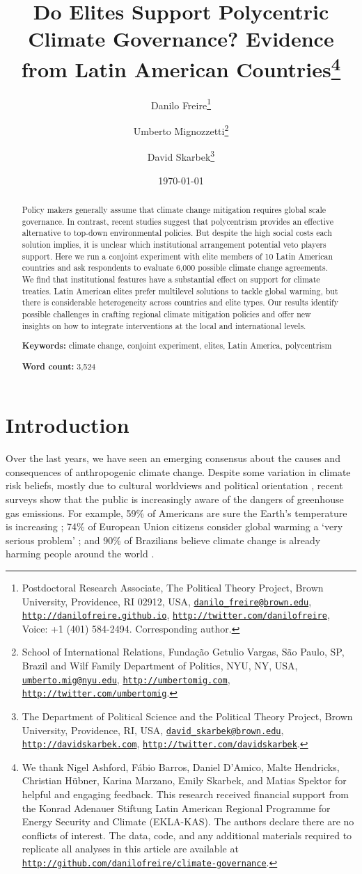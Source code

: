 \documentclass[a4paper,12pt]{article}
\title{Do Elites Support Polycentric Climate Governance? Evidence from Latin American Countries\thanks{We thank Nigel Ashford, F\'{a}bio Barros, Daniel D'Amico, Malte Hendricks, Christian H\"{u}bner, Karina Marzano, Emily Skarbek, and Matias Spektor for helpful and engaging feedback. This research received financial support from the Konrad Adenauer Stiftung Latin American Regional Programme for Energy Security and Climate (EKLA-KAS). The authors declare there are no conflicts of interest. The data, code, and any additional materials required to replicate all analyses in this article are available at \href{http://github.com/danilofreire/climate-governance}{\texttt{http://github.com/danilofreire/climate-governance}}.}}
\author{Danilo Freire\thanks{Postdoctoral Research Associate, The Political Theory Project, Brown University, Providence, RI 02912, USA, \href{mailto:danilo_freire@brown.edu}{\texttt{danilo\_freire@brown.edu}}, \href{http://danilofreire.github.io}{\texttt{http://danilofreire.github.io}}, \href{http://twitter.com/danilofreire}{\texttt{http://twitter.com/danilofreire}}, Voice: +1 (401) 584-2494. Corresponding author.} 
\and Umberto Mignozzetti\thanks{School of International Relations, Funda\c{c}\~{a}o Getulio Vargas, S\~{a}o Paulo, SP, Brazil and Wilf Family Department of Politics, NYU, NY, USA, \href{mailto:umberto.mig@nyu.edu}{\texttt{umberto.mig@nyu.edu}}, \href{http://umbertomig.com}{\texttt{http://umbertomig.com}}, \href{http://twitter.com/umbertomig}{\texttt{http://twitter.com/umbertomig}}.} \and David Skarbek\thanks{The Department of Political Science and the Political Theory Project, Brown University, Providence, RI, USA, \href{mailto:david_skarbek@brown.edu}{\texttt{david\_skarbek@brown.edu}}, \href{http://davidskarbek.com}{\texttt{http://davidskarbek.com}}, \href{http://twitter.com/davidskarbek}{\texttt{http://twitter.com/davidskarbek}}.}
}
\date{\today}
\begin{document}
\maketitle

\begin{abstract}
\onehalfspacing
\noindent
Policy makers generally assume that climate change mitigation requires global scale governance. In contrast, recent studies suggest that polycentrism provides an effective alternative to top-down environmental policies. But despite the high social costs each solution implies, it is unclear which institutional arrangement potential veto players support. Here we run a conjoint experiment with elite members of 10 Latin American countries and ask respondents to evaluate 6,000 possible climate change agreements. We find that institutional features have a substantial effect on support for climate treaties. Latin American elites prefer multilevel solutions to tackle global warming, but there is considerable heterogeneity across countries and elite types. Our results identify possible challenges in crafting regional climate mitigation policies and offer new insights on how to integrate interventions at the local and international levels.

\vspace{.5cm}

\noindent 
\textbf{Keywords:} climate change, conjoint experiment, elites, Latin America, polycentrism

\vspace{.5cm}

\noindent 
\textbf{Word count:} 3,524
\end{abstract}

\newpage

\doublespacing

\section{Introduction}%
\label{sec:introduction}

Over the last years, we have seen an emerging consensus about the causes and consequences of anthropogenic climate change. Despite some variation in climate risk beliefs, mostly due to cultural worldviews and political orientation \citep{hornsey2016meta}, recent surveys show that the public is increasingly aware of the dangers of greenhouse gas emissions. For example, 59\% of Americans are sure the Earth's temperature is increasing \citep{stanfordearth2018}; 74\% of European Union citizens consider global warming a `very serious problem' \citep{europe2018survey}; and 90\% of Brazilians believe climate change is already harming people around the world \citep{pew2018climate}.
\end{document}
